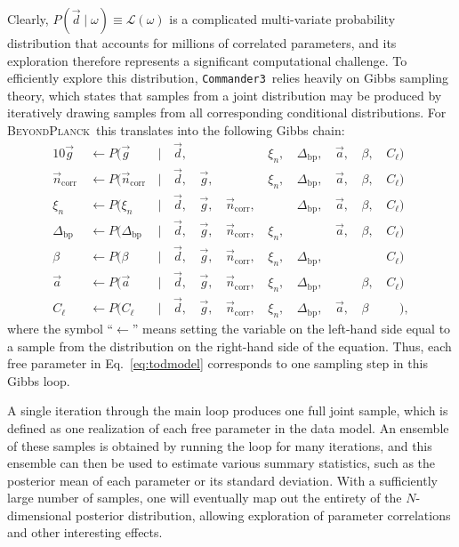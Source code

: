 \documentclass[twocolumn]{aa}
\def\commanderthree{\texttt{Commander3}}
\renewcommand{\d}[0]{\vec{d}}
\newcommand{\n}[0]{\vec{n}}
\newcommand{\s}[0]{\vec{s}}
\renewcommand{\a}[0]{\vec{a}}
\newcommand{\g}[0]{\vec{g}}
\newcommand{\Dbp}[0]{\Delta_{\mathrm{bp}}}
\newcommand{\BP}{\textsc{BeyondPlanck}}
\begin{document}
Clearly, $P(\d\mid \omega)\equiv\mathcal{L}(\omega)$ is a complicated
multi-variate probability distribution that accounts for millions of
correlated parameters, and its exploration therefore represents a
significant computational challenge. To efficiently explore this
distribution, \commanderthree\ relies heavily on Gibbs sampling
theory, which states that samples from a joint distribution may be
produced by iteratively drawing samples from all corresponding
conditional distributions. For \BP\, this translates into the
following Gibbs chain:
\begin{alignat}{10}
\label{eq:gibbsstart}
\g &\,\leftarrow P(\g&\,\mid &\,\d,&\, & &\,\xi_n, &\,\Dbp, &\,\a, &\,\beta, &\,C_{\ell})\\
\n_{\mathrm{corr}} &\,\leftarrow P(\n_{\mathrm{corr}}&\,\mid &\,\d, &\,\g, &\,&\,\xi_n,
&\,\Dbp, &\,\a, &\,\beta, &\,C_{\ell})\\
\xi_n &\,\leftarrow P(\xi_n&\,\mid &\,\d, &\,\g, &\,\n_{\mathrm{corr}}, &\,
&\,\Dbp, &\,\a, &\,\beta, &\,C_{\ell})\\
\Dbp &\,\leftarrow P(\Dbp&\,\mid &\,\d, &\,\g, &\,\n_{\mathrm{corr}}, &\,\xi_n,
&\,&\,\a, &\,\beta, &\,C_{\ell})\\
\beta &\,\leftarrow P(\beta&\,\mid &\,\d, &\,\g, &\,\n_{\mathrm{corr}}, &\,\xi_n,
&\,\Dbp, & &\,&\,C_{\ell})\\
\a &\,\leftarrow P(\a&\,\mid &\,\d, &\,\g, &\,\n_{\mathrm{corr}}, &\,\xi_n,
&\,\Dbp, &\,&\,\beta, &\,C_{\ell})\\
C_{\ell} &\,\leftarrow P(C_{\ell}&\,\mid &\,\d, &\,\g, &\,\n_{\mathrm{corr}}, &\,\xi_n,
&\,\Dbp, &\,\a, &\,\beta&\,\phantom{C_{\ell}}),
\label{eq:gibbschain}
\end{alignat}
where the symbol ``$\leftarrow$'' means setting the variable on the
left-hand side equal to a sample from the distribution on the
right-hand side of the equation. Thus, each free parameter in
Eq.~\eqref{eq:todmodel} corresponds to one sampling step in this Gibbs
loop.

A single iteration through the main loop produces one full joint
sample, which is defined as one realization of each free
parameter in the data model. An ensemble of these samples is obtained
by running the loop for many iterations, and this ensemble can then be
used to estimate various summary statistics, such as the posterior
mean of each parameter or its standard deviation. With a sufficiently
large number of samples, one will eventually map out the entirety of
the $N$-dimensional posterior distribution, allowing exploration of
parameter correlations and other interesting effects.
\end{document}
